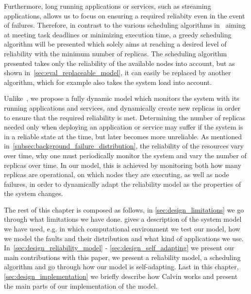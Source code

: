 \documentclass{cslthse-msc}
\begin{document}
Furthermore, long running applications or services, such as streaming applications, allows us to focus on ensuring a required reliabity even in the event of failures. Therefore, in contrast to the various scheduling algorithms in~\cite{algoOptTimeMaxRel, optTaskAllocationForMaxRel, taskAllocation, taskAllocationSwarm, algoMaxRelEndToEndConstraint, algoMinExTime, schedReplicas} aiming at meeting task deadlines or minimizing execution time, a greedy scheduling algorithm will be presented which solely aims at reaching a desired level of reliability with the minimum number of replicas. The scheduling algorithm presented takes only the reliability of the available nodes into account, but as shown in~\ref{sec:eval_replaceable_model}, it can easily be replaced by another algorithm, which for example also takes the system load into account.

Unlike~\cite{designFaultTolerantSched, evalReplicationSched, taskSchedulingReplication, effTaskReplMobGrid, relGridServicePredConstraint}, we propose a fully dynamic model which monitors the system with its running applications and services, and dynamically create new replicas in order to ensure that the required reliability is met. Determining the number of replicas needed only when deploying an application or service may suffer if the system is in a reliable state at the time, but later becomes more unreliable. As mentioned in~\cref{subsec:background_failure_distribution}, the reliability of the resources vary over time, why one must periodically monitor the system and vary the number of replicas over time. In our model, this is achieved by monitoring both how many replicas are operational, on which nodes they are executing, as well as node failures, in order to dynamically adapt the reliability model as the properties of the system changes.

The rest of this chapter is composed as follows, in \cref{sec:design_limitations} we go through what limitations we have done.  gives a description of the system model we have used, e.g. in which computational environment we test our model, how we model the faults and their distribution and what kind of applications we use. In~\cref{sec:design_reliability_model} - \cref{sec:design_self_adapting} we present our main contributions with this paper, we present a reliability model, a scheduling algorithm and go through how our model is self-adapting. Last in this chapter, \cref{sec:design_implementation} we briefly describe how Calvin works and present the main parts of our implementation of the model.
\end{document}
